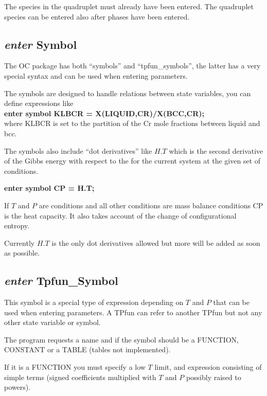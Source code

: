 \documentclass[11pt]{article}
\begin{document}
The species in the quadruplet must already have been entered.  The
quadruplet species can be entered also after phases have been
entered.

\hypertarget{Enter symbol}{}
\subsection{{\em enter} Symbol}\label{sc:entersymbol}

The OC package has both ``symbols'' and ``tpfun\_symbols'', the latter
has a very special syntax and can be used when entering parameters.

The symbols are designed to handle relations between state variables,
you can define expressions like \\
{\bf enter symbol KLBCR = X(LIQUID,CR)/X(BCC,CR);}\\
where KLBCR is set to the partition of the Cr mole fractions between
liquid and bcc.

The symbols also include ``dot derivatives'' like $H.T$ which is the
second derivative of the Gibbs energy with respect to the for the
current system at the given set of conditions.

{\bf enter symbol CP = H.T;}

If $T$ and $P$ are conditions and all other conditions are mass
balance conditions CP is the heat capacity.  It also takes account of
the change of configurational entropy.

Currently $H.T$ is the only dot derivatives allowed but more will be
added as soon as possible.

\hypertarget{Enter TPfun}{}
\subsection{{\em enter} Tpfun\_Symbol}\label{sc:entertpf}

This symbol is a special type of expression depending on $T$ and $P$
that can be used when entering parameters.  A TPfun can refer to
another TPfun but not any other state variable or symbol.

The program requests a name and if the symbol should be a FUNCTION,
CONSTANT or a TABLE (tables not implemented).

If it is a FUNCTION you must specify a low $T$ limit, and expression
consisting of simple terms (signed coefficients multiplied with $T$
and $P$ possibly raised to powers).
\end{document}

